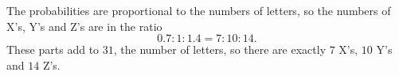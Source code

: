 The probabilities are proportional to the numbers of letters, so the numbers of X's, Y's and Z's are in the ratio
\[
0.7:1:1.4=7:10:14 .
\]
These parts add to $31$, the number of letters, so there are exactly $7$ X's, $\boxed{10}$ Y's and $14$ Z's.
